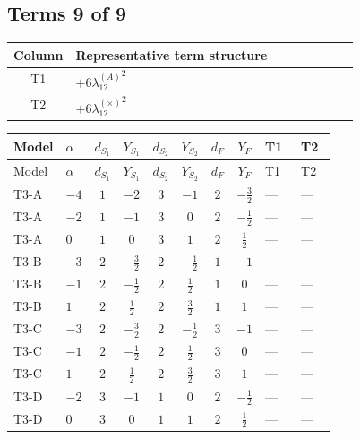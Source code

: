 \documentclass[8pt]{article}
\begin{document}
\begin{landscape}
\subsection*{Terms 9 of 9}
\begin{center}
\begin{tabular}{@{}c >{\raggedright\arraybackslash}p{0.82\linewidth}@{}}
\toprule
Column & Representative term structure \\
\midrule
T1 & \(\displaystyle +6 {\lambda_{12}^{(A)}}^2\) \\
\midrule
T2 & \(\displaystyle +6 {\lambda_{12}^{(\times)}}^2\) \\
\midrule
\bottomrule
\end{tabular}
\end{center}
\smallskip
\tiny
\begin{longtable}{@{}llcccccc >{\raggedright\arraybackslash}p{0.21\linewidth} >{\raggedright\arraybackslash}p{0.21\linewidth}@{}}
\toprule
Model & $\alpha$ & $d_{S_1}$ & $Y_{S_1}$ & $d_{S_2}$ & $Y_{S_2}$ & $d_F$ & $Y_F$ & T1 & T2 \\
\midrule
\endfirsthead
\toprule
Model & $\alpha$ & $d_{S_1}$ & $Y_{S_1}$ & $d_{S_2}$ & $Y_{S_2}$ & $d_F$ & $Y_F$ & T1 & T2 \\
\midrule
\endhead
T3-A & $-4$ & $1$ & $-2$ & $3$ & $-1$ & $2$ & $-\frac{3}{2}$ & --- & --- \\
\midrule
T3-A & $-2$ & $1$ & $-1$ & $3$ & $0$ & $2$ & $-\frac{1}{2}$ & --- & --- \\
\midrule
T3-A & $0$ & $1$ & $0$ & $3$ & $1$ & $2$ & $\frac{1}{2}$ & --- & --- \\
\midrule
T3-B & $-3$ & $2$ & $-\frac{3}{2}$ & $2$ & $-\frac{1}{2}$ & $1$ & $-1$ & --- & --- \\
\midrule
T3-B & $-1$ & $2$ & $-\frac{1}{2}$ & $2$ & $\frac{1}{2}$ & $1$ & $0$ & --- & --- \\
\midrule
T3-B & $1$ & $2$ & $\frac{1}{2}$ & $2$ & $\frac{3}{2}$ & $1$ & $1$ & --- & --- \\
\midrule
T3-C & $-3$ & $2$ & $-\frac{3}{2}$ & $2$ & $-\frac{1}{2}$ & $3$ & $-1$ & --- & --- \\
\midrule
T3-C & $-1$ & $2$ & $-\frac{1}{2}$ & $2$ & $\frac{1}{2}$ & $3$ & $0$ & --- & --- \\
\midrule
T3-C & $1$ & $2$ & $\frac{1}{2}$ & $2$ & $\frac{3}{2}$ & $3$ & $1$ & --- & --- \\
\midrule
T3-D & $-2$ & $3$ & $-1$ & $1$ & $0$ & $2$ & $-\frac{1}{2}$ & --- & --- \\
\midrule
T3-D & $0$ & $3$ & $0$ & $1$ & $1$ & $2$ & $\frac{1}{2}$ & --- & --- \\

\end{longtable}
\end{landscape}
\end{document}
